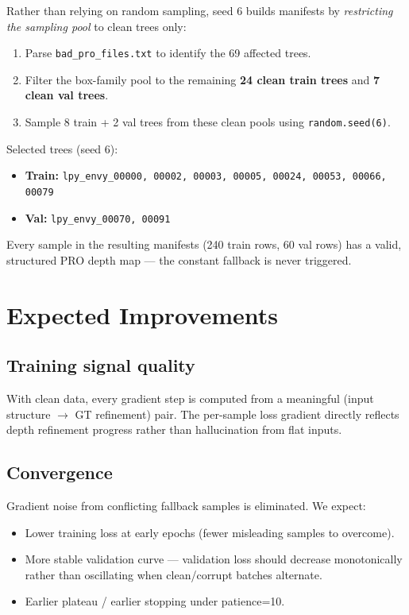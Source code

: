 \documentclass[11pt]{article}
\begin{document}
Rather than relying on random sampling, seed 6 builds manifests by
\emph{restricting the sampling pool} to clean trees only:

\begin{enumerate}
  \item Parse \texttt{bad\_pro\_files.txt} to identify the 69 affected trees.
  \item Filter the box-family pool to the remaining \textbf{24 clean train
    trees} and \textbf{7 clean val trees}.
  \item Sample 8 train + 2 val trees from these clean pools using
    \texttt{random.seed(6)}.
\end{enumerate}

Selected trees (seed 6):
\begin{itemize}
  \item \textbf{Train:} \texttt{lpy\_envy\_00000, 00002, 00003, 00005,
    00024, 00053, 00066, 00079}
  \item \textbf{Val:} \texttt{lpy\_envy\_00070, 00091}
\end{itemize}

Every sample in the resulting manifests (240 train rows, 60 val rows) has a
valid, structured PRO depth map — the constant fallback is never triggered.

\section{Expected Improvements}

\subsection*{Training signal quality}

With clean data, every gradient step is computed from a meaningful
(input structure $\to$ GT refinement) pair.  The per-sample loss
gradient directly reflects depth refinement progress rather than
hallucination from flat inputs.

\subsection*{Convergence}

Gradient noise from conflicting fallback samples is eliminated.
We expect:
\begin{itemize}
  \item Lower training loss at early epochs (fewer misleading samples
    to overcome).
  \item More stable validation curve — validation loss should decrease
    monotonically rather than oscillating when clean/corrupt batches
    alternate.
  \item Earlier plateau / earlier stopping under patience=10.
\end{itemize}
\end{document}
